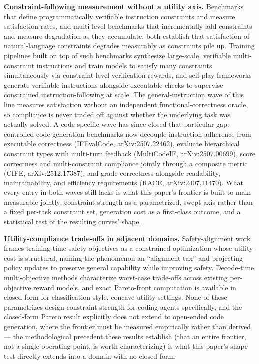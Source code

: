 \documentclass[11pt]{article}
\begin{document}
\textbf{Constraint-following measurement without a utility axis.} Benchmarks that define programmatically verifiable instruction constraints and measure satisfaction rates, and multi-level benchmarks that incrementally add constraints and measure degradation as they accumulate, both establish that satisfaction of natural-language constraints degrades measurably as constraints pile up. Training pipelines built on top of such benchmarks synthesize large-scale, verifiable multi-constraint instructions and train models to satisfy many constraints simultaneously via constraint-level verification rewards, and self-play frameworks generate verifiable instructions alongside executable checks to supervise constrained instruction-following at scale. The general-instruction wave of this line measures satisfaction without an independent functional-correctness oracle, so compliance is never traded off against whether the underlying task was actually solved. A code-specific wave has since closed that particular gap: controlled code-generation benchmarks now decouple instruction adherence from executable correctness (IFEvalCode, arXiv:2507.22462), evaluate hierarchical constraint types with multi-turn feedback (MultiCodeIF, arXiv:2507.00699), score correctness and multi-constraint compliance jointly through a composite metric (CIFE, arXiv:2512.17387), and grade correctness alongside readability, maintainability, and efficiency requirements (RACE, arXiv:2407.11470). What every entry in both waves still lacks is what this paper's frontier is built to make measurable jointly: constraint strength as a parametrized, swept axis rather than a fixed per-task constraint set, generation cost as a first-class outcome, and a statistical test of the resulting curves' shape.

\textbf{Utility-compliance trade-offs in adjacent domains.} Safety-alignment work frames training-time safety objectives as a constrained optimization whose utility cost is structural, naming the phenomenon an ``alignment tax'' and projecting policy updates to preserve general capability while improving safety. Decode-time multi-objective methods characterize worst-case trade-offs across existing per-objective reward models, and exact Pareto-front computation is available in closed form for classification-style, concave-utility settings. None of these parametrizes design-constraint strength for coding agents specifically, and the closed-form Pareto result explicitly does not extend to open-ended code generation, where the frontier must be measured empirically rather than derived --- the methodological precedent these results establish (that an entire frontier, not a single operating point, is worth characterizing) is what this paper's shape test directly extends into a domain with no closed form.
\end{document}
